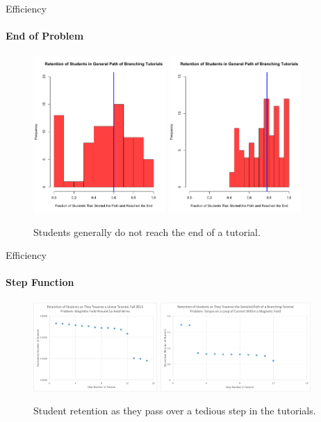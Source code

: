 \documentclass[xcolor=x11names,compress]{beamer}
\begin{document}
\begin{frame}{Efficiency}
	\framesubtitle{End of Problem}
	\begin{figure}
		\centering
		\includegraphics[width=0.45\textwidth]{img/retention_general.pdf}
		\includegraphics[width=0.45\textwidth]{img/retention_filtered.pdf}
		\caption{Students generally do not reach the end of a tutorial.}
		\label{fig:retention_examples}
	\end{figure}	
\end{frame}

\begin{frame}{Efficiency}
	\framesubtitle{Step Function}
	\begin{figure}
		\centering
		\includegraphics[width=0.42\textwidth]{img/step_function_1.png}
		\hspace{2mm}
		\includegraphics[width=0.51\textwidth]{img/step_function_2.png}
		\caption{Student retention as they pass over a tedious step in the tutorials.}
		\label{fig:step_function_examples}
	\end{figure}	
\end{frame}
\end{document}
